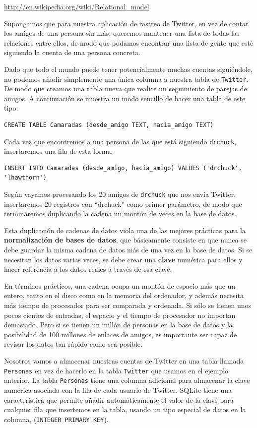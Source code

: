 \url{http://en.wikipedia.org/wiki/Relational_model}

Supongamos que para nuestra aplicación de rastreo de Twitter, en vez de contar
los amigos de una persona sin más, queremos mantener una lista de
todas las relaciones entre ellos, de modo que podamos encontrar una lista de
gente que esté siguiendo la cuenta de una persona concreta.

Dado que todo el mundo puede tener potencialmente muchas cuentas siguiéndole,
no podemos añadir simplemente una única columna a nuestra tabla de {\tt Twitter}.
De modo que creamos una tabla nueva que realice un seguimiento de parejas de amigos.
A continuación se muestra un modo sencillo de hacer una tabla de este tipo:

\beforeverb
\begin{verbatim}
CREATE TABLE Camaradas (desde_amigo TEXT, hacia_amigo TEXT)
\end{verbatim}
\afterverb
%
Cada vez que encontremos a una persona de las que está siguiendo {\tt drchuck},
insertaremos una fila de esta forma:

\beforeverb
\begin{verbatim}
INSERT INTO Camaradas (desde_amigo, hacia_amigo) VALUES ('drchuck', 'lhawthorn')
\end{verbatim}
\afterverb
%
Según vayamos procesando los 20 amigos de {\tt drchuck}
que nos envía Twitter, insertaremos 20 registros con ``drchuck''
como primer parámetro, de modo que terminaremos duplicando la
cadena un montón de veces en la base de datos.

Esta duplicación de cadenas de datos viola una de las mejores prácticas
para la {\bf normalización de bases de datos}, que básicamente consiste en
que nunca se debe guardar la misma cadena de datos más de una vez en la base de datos.
Si se necesitan los datos varias veces, se debe crear una
{\bf clave} numérica para ellos y hacer referencia a los datos reales
a través de esa clave.

En términos prácticos, una cadena ocupa un montón
de espacio más que un entero, tanto en el disco como en
la memoria del ordenador, y además necesita más tiempo de procesador
para ser comparada y ordenada. Si sólo se tienen unos pocos cientos de entradas,
el espacio y el tiempo de procesador no importan demasiado. Pero si se tienen
un millón de personas en la base de datos y la posibilidad de 100 millones
de enlaces de amigos, es importante ser capaz de revisar los datos tan rápido
como sea posible.

Nosotros vamos a almacenar nuestras cuentas de Twitter en una tabla llamada {\tt Personas}
en vez de hacerlo en la tabla {\tt Twitter} que usamos en el ejemplo anterior.
La tabla {\tt Personas} tiene una columna adicional
para almacenar la clave numérica asociada con la
fila de cada usuario de Twitter.
SQLite tiene una característica que permite añadir automáticamente el valor de la clave
para cualquier fila que insertemos en la tabla, usando un tipo especial de
datos en la columna, ({\tt INTEGER PRIMARY KEY}).


